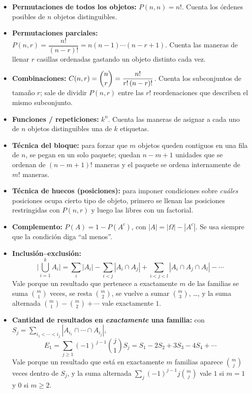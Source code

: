 \documentclass[11pt]{article}
\begin{document}
\begin{teo}
\begin{itemize}[leftmargin=*]
  \item \textbf{Permutaciones de todos los objetos:} $P(n,n)=n!$. Cuenta los \'ordenes posibles de $n$ objetos distinguibles.
  \item \textbf{Permutaciones parciales:} $P(n,r)=\dfrac{n!}{(n-r)!}=n(n-1)\cdots(n-r+1)$. Cuenta las maneras de llenar $r$ casillas ordenadas gastando un objeto distinto cada vez.
  \item \textbf{Combinaciones:} $C(n,r)=\dbinom{n}{r}=\dfrac{n!}{r!\,(n-r)!}$. Cuenta los subconjuntos de tama\~no $r$; sale de dividir $P(n,r)$ entre las $r!$ reordenaciones que describen el mismo subconjunto.
  \item \textbf{Funciones / repeticiones:} $k^{n}$. Cuenta las maneras de asignar a cada uno de $n$ objetos distinguibles una de $k$ etiquetas.
  \item \textbf{T\'ecnica del bloque:} para forzar que $m$ objetos queden contiguos en una fila de $n$, se pegan en un solo paquete; quedan $n-m+1$ unidades que se ordenan de $(n-m+1)!$ maneras y el paquete se ordena internamente de $m!$ maneras.
  \item \textbf{T\'ecnica de huecos (posiciones):} para imponer condiciones sobre \emph{cu\'ales} posiciones ocupa cierto tipo de objeto, primero se llenan las posiciones restringidas con $P(n,r)$ y luego las libres con un factorial.
  \item \textbf{Complemento:} $P(A)=1-P(A^{c})$, con $|A|=|\Omega|-|A^{c}|$. Se usa siempre que la condici\'on diga ``al menos''.
  \item \textbf{Inclusi\'on--exclusi\'on:}
  \[
    \Big|\bigcup_{i=1}^{k}A_i\Big|=\sum_i |A_i|-\sum_{i<j}|A_i\cap A_j|+\sum_{i<j<l}|A_i\cap A_j\cap A_l|-\cdots
  \]
  Vale porque un resultado que pertenece a exactamente $m$ de las familias se suma $\binom{m}{1}$ veces, se resta $\binom{m}{2}$, se vuelve a sumar $\binom{m}{3}$, \dots, y la suma alternada $\binom{m}{1}-\binom{m}{2}+\cdots$ vale exactamente $1$.
  \item \textbf{Cantidad de resultados en \emph{exactamente} una familia:} con $S_j=\sum_{i_1<\cdots<i_j}|A_{i_1}\cap\cdots\cap A_{i_j}|$,
  \[
    E_1=\sum_{j\ge 1}(-1)^{\,j-1}\binom{j}{1}S_j = S_1-2S_2+3S_3-4S_4+\cdots
  \]
  Vale porque un resultado que est\'a en exactamente $m$ familias aparece $\binom{m}{j}$ veces dentro de $S_j$, y la suma alternada $\sum_j(-1)^{j-1}j\binom{m}{j}$ vale $1$ si $m=1$ y $0$ si $m\ge 2$.
\end{itemize}
\end{teo}
\end{document}
